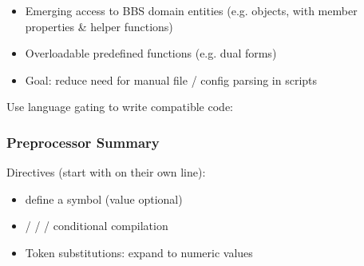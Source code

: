 \documentclass[letterpaper,10pt,english]{sphinxmanual}
\begin{document}
\begin{itemize}
\begin{itemize}
\item {} 
\sphinxAtStartPar
Emerging  access to BBS domain entities (e.g.  objects, with member properties \& helper functions)

\item {} 
\sphinxAtStartPar
Overloadable predefined functions (e.g. dual  forms)

\item {} 
\sphinxAtStartPar
Goal: reduce need for manual file / config parsing in scripts

\end{itemize}

\end{itemize}

\sphinxAtStartPar
Use language gating to write compatible code:

\begin{sphinxVerbatim}[commandchars=\\\{\}]
     
     
\end{sphinxVerbatim}


\subsubsection{Preprocessor Summary}
\label{\detokenize{ppl:preprocessor-summary}}
\sphinxAtStartPar
Directives (start with \sphinxcode{\sphinxupquote{;\$}} on their own line):
\begin{itemize}
\item {} 
\sphinxAtStartPar
{} \textendash{} define a symbol (value optional)

\item {} 
\sphinxAtStartPar
{} /  /  /  \textendash{} conditional compilation

\item {} 
\sphinxAtStartPar
Token substitutions:    expand to numeric values

\end{itemize}
\end{document}
